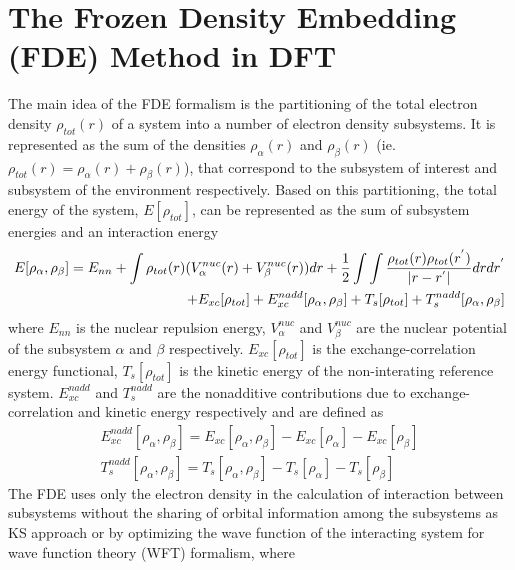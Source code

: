 \documentclass[a4paper,11pt]{report}
\begin{document}
\section{The Frozen Density Embedding (FDE) Method in DFT}
The main idea of the FDE formalism \citep{wesolowski1993frozen,gomes2012quantum} is the partitioning of the total electron density $\rho_{tot}(r)$ of a system
into a number of electron density subsystems. It is represented as the sum of the densities
$\rho_{\alpha}(r)$ and $\rho_{\beta}(r)$ (ie. $\rho_{tot}(r)=\rho_{\alpha}(r) +\rho_{\beta}(r)$), that correspond to the subsystem of interest and subsystem
of the environment respectively. Based on this partitioning, the total energy of the system, $E[\rho_{tot}]$, can be represented as the sum
of subsystem energies and an interaction energy
\begin{equation}\label{int}
\begin{split}
E[\rho_{\alpha}, \rho_{\beta}] =  E_{nn} + \int\rho_{tot}(r)(V_{\alpha}^{nuc}(r) + V_{\beta}^{nuc}(r))dr
+ \frac{1}{2}\int\int\frac{\rho_{tot}(r)\rho_{tot}(r^{'})}{|r-r^{'}|}drdr^{'}\\
\hspace{-10mm} + E_{xc}[\rho_{tot}]+ E_{xc}^{nadd}[\rho_{\alpha}, \rho_{\beta}]
+ T_{s}[\rho_{tot}]+ T_{s}^{nadd}[\rho_{\alpha}, \rho_{\beta}]
\end{split}
\end{equation}
where $E_{nn}$ is the nuclear repulsion energy, $V_{\alpha}^{nuc}$ and $V_{\beta}^{nuc}$ are the nuclear potential of the subsystem  $\alpha$ and $\beta$ respectively. 
$E_{xc}[\rho_{tot}]$ is the exchange-correlation energy functional, $T_{s}[\rho_{tot}]$ is the kinetic energy of the non-interating reference
system. $E_{xc}^{nadd}$ and $T_{s}^{nadd}$ are the nonadditive contributions due to exchange-correlation and kinetic energy respectively and are
defined as
\begin{equation}\label{inta}
\begin{split}
E_{xc}^{nadd}[\rho_{\alpha}, \rho_{\beta}] = E_{xc}[\rho_{\alpha}, \rho_{\beta}] - E_{xc}[\rho_{\alpha}] - E_{xc}[\rho_{\beta}] \\
T_{s}^{nadd}[\rho_{\alpha}, \rho_{\beta}] = T_{s}[\rho_{\alpha}, \rho_{\beta}] - T_{s}[\rho_{\alpha}] - T_{s}[\rho_{\beta}]
\end{split}
\end{equation}
The FDE uses only the electron density in the calculation of interaction between subsystems without the sharing of orbital information among the 
subsystems as KS approach or by optimizing the wave function of the interacting system for wave function theory (WFT) formalism, where 
\end{document}

